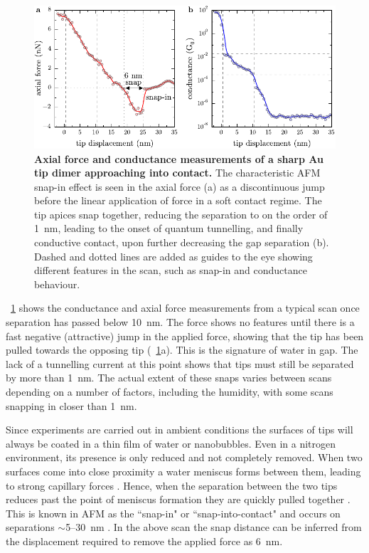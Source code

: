 \documentclass[a4paper]{article}
\begin{document}
\begin{figure}[bt]
\centering
\includegraphics{figures/tip_scanning_properties}
\caption[Axial force and conductance measurements of a sharp Au tip dimer approaching into contact]{\textbf{Axial force and conductance measurements of a sharp Au tip dimer approaching into contact.} The characteristic AFM snap-in effect is seen in the axial force (a) as a discontinuous jump before the linear application of force in a soft contact regime. The tip apices snap together, reducing the separation to on the order of \SI{1}{nm}, leading to the onset of quantum tunnelling, and finally conductive contact, upon further decreasing the gap separation (b). Dashed and dotted lines are added as guides to the eye showing different features in the scan, such as snap-in and conductance behaviour.}
\label{fig:tip_scan_props}
\end{figure}

\figurename~\ref{fig:tip_scan_props} shows the conductance and axial force measurements from a typical scan once separation has passed below \SI{10}{nm}. The force shows no features until there is a fast negative (attractive) jump in the applied force, showing that the tip has been pulled towards the opposing tip (\figurename~\ref{fig:tip_scan_props}a). This is the signature of water in gap. The lack of a tunnelling current at this point shows that tips must still be separated by more than \SI{1}{nm}. The actual extent of these snaps varies between scans depending on a number of factors, including the humidity, with some scans snapping in closer than \SI{1}{nm}.

Since experiments are carried out in ambient conditions the surfaces of tips will always be coated in a thin film of water or nanobubbles. Even in a nitrogen environment, its presence is only reduced and not completely removed. When two surfaces come into close proximity a water meniscus forms between them, leading to strong capillary forces \cite{gan2009atomic}. Hence, when the separation between the two tips reduces past the point of meniscus formation they are quickly pulled together \cite{holmberg2003}. This is known in AFM as the ``snap-in" or ``snap-into-contact" and occurs on separations $\sim$5--\SI{30}{nm} \cite{holmberg2003, song2014}. In the above scan the snap distance can be inferred from the displacement required to remove the applied force as \SI{6}{nm}.
\end{document}
